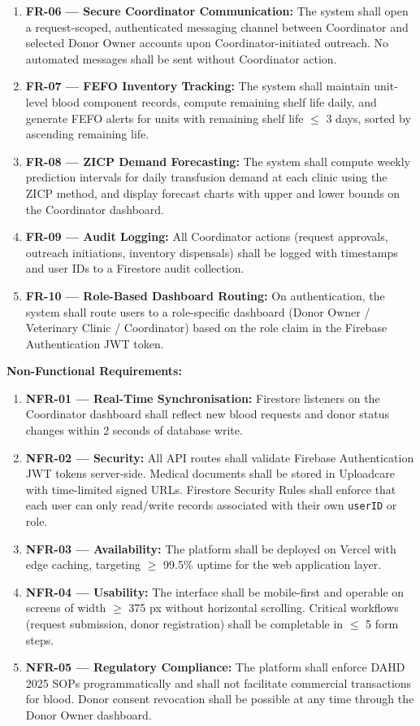 \documentclass[12pt,a4paper]{article}
\begin{document}
\begin{enumerate}[leftmargin=1.8em, itemsep=0.4em]
    \item \textbf{FR-06 — Secure Coordinator Communication:} The system shall open a request-scoped, authenticated messaging channel between Coordinator and selected Donor Owner accounts upon Coordinator-initiated outreach. No automated messages shall be sent without Coordinator action.
    \item \textbf{FR-07 — FEFO Inventory Tracking:} The system shall maintain unit-level blood component records, compute remaining shelf life daily, and generate FEFO alerts for units with remaining shelf life $\leq$ 3 days, sorted by ascending remaining life.
    \item \textbf{FR-08 — ZICP Demand Forecasting:} The system shall compute weekly prediction intervals for daily transfusion demand at each clinic using the ZICP method, and display forecast charts with upper and lower bounds on the Coordinator dashboard.
    \item \textbf{FR-09 — Audit Logging:} All Coordinator actions (request approvals, outreach initiations, inventory dispensals) shall be logged with timestamps and user IDs to a Firestore audit collection.
    \item \textbf{FR-10 — Role-Based Dashboard Routing:} On authentication, the system shall route users to a role-specific dashboard (Donor Owner / Veterinary Clinic / Coordinator) based on the role claim in the Firebase Authentication JWT token.
\end{enumerate}

\noindent\textbf{Non-Functional Requirements:}

\begin{enumerate}[leftmargin=1.8em, itemsep=0.4em]
    \item \textbf{NFR-01 — Real-Time Synchronisation:} Firestore listeners on the Coordinator dashboard shall reflect new blood requests and donor status changes within 2 seconds of database write.
    \item \textbf{NFR-02 — Security:} All API routes shall validate Firebase Authentication JWT tokens server-side. Medical documents shall be stored in Uploadcare with time-limited signed URLs. Firestore Security Rules shall enforce that each user can only read/write records associated with their own \texttt{userID} or role.
    \item \textbf{NFR-03 — Availability:} The platform shall be deployed on Vercel with edge caching, targeting $\geq$ 99.5\% uptime for the web application layer.
    \item \textbf{NFR-04 — Usability:} The interface shall be mobile-first and operable on screens of width $\geq$ 375 px without horizontal scrolling. Critical workflows (request submission, donor registration) shall be completable in $\leq$ 5 form steps.
    \item \textbf{NFR-05 — Regulatory Compliance:} The platform shall enforce DAHD 2025 SOPs programmatically and shall not facilitate commercial transactions for blood. Donor consent revocation shall be possible at any time through the Donor Owner dashboard.
\end{enumerate}
\end{document}
